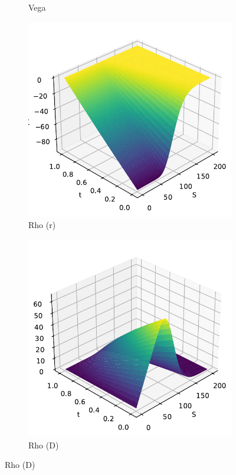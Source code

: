 \begin{figure}[H]
\begin{subfigure}[b]{0.3\linewidth}
        \caption{Vega}
    \end{subfigure}
    \begin{subfigure}[b]{0.3\linewidth}
        \includegraphics[width=\linewidth]{Imagenes/Parte1/6_Sols/Put/Put_Rho_r.pdf}
        \caption{Rho (r)}
    \end{subfigure}
    \begin{subfigure}[b]{0.3\linewidth}
        \includegraphics[width=\linewidth]{Imagenes/Parte1/6_Sols/Put/Put_Rho_D.pdf}
        \caption{Rho (D)}
    \end{subfigure}
\end{figure}



